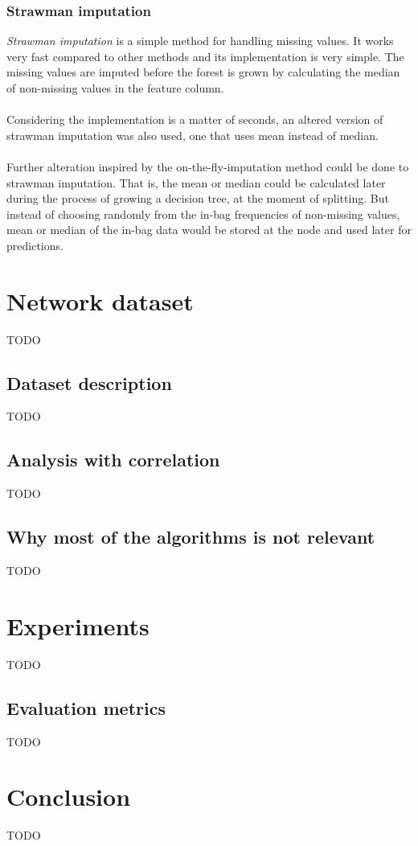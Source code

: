 \documentclass[11pt]{article}
\begin{document}
      \subsubsection{Strawman imputation}
        {\it Strawman imputation} \cite{otfi} is a simple method for handling missing values. It works very fast compared to other methods and its implementation is very simple. The missing values are imputed before the forest is grown by calculating the median of non-missing values in the feature column.
        \\~\\
        Considering the implementation is a matter of seconds, an altered version of strawman imputation was also used, one that uses mean instead of median.
        \\~\\
        Further alteration inspired by the on-the-fly-imputation method could be done to strawman imputation. That is, the mean or median could be calculated later during the process of growing a decision tree, at the moment of splitting. But instead of choosing randomly from the in-bag frequencies of non-missing values, mean or median of the in-bag data would be stored at the node and used later for predictions.
  \section{Network dataset}
    {\color{red}TODO}
    \subsection{Dataset description}
      {\color{red}TODO}
    \subsection{Analysis with correlation}
      {\color{red}TODO}
    \subsection{Why most of the algorithms is not relevant}
      {\color{red}TODO}
  \newpage
  \section{Experiments}
    {\color{red}TODO}
    \subsection{Evaluation metrics}
      {\color{red}TODO}
  \newpage
  \section*{Conclusion}
    {\color{red}TODO}
  \newpage
  
\end{document}
